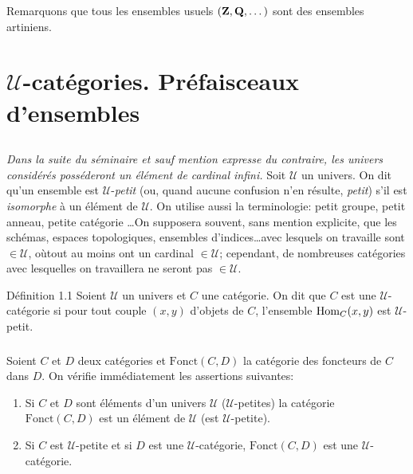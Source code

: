 \documentclass[10pt]{../fichiers-configuration-latex/smfart}
\begin{document}
Remarquons que tous les ensembles usuels $(\mathbf{Z}, \mathbf{Q},\dots)$ sont
des ensembles artiniens.

\section{$𝒰$-catégories. Préfaisceaux d'ensembles}

\setcounter{subsection}{-1}
\subsection{}
\emph{Dans la suite du séminaire et sauf mention expresse du
  contraire, les univers considérés posséderont un élément
  de cardinal infini.} Soit $𝒰$ un univers. On dit qu'un ensemble
  est $𝒰$-\emph{petit} (ou, quand aucune confusion n'en résulte,
  \emph{petit}) s'il est \emph{isomorphe} à un élément de
  $𝒰$. On utilise aussi la terminologie: petit groupe, petit anneau,
  petite catégorie
  \ldots On supposera souvent, sans mention
  explicite, que les schémas, espaces topologiques, ensembles
  d'indices\ldots avec lesquels on travaille sont $\in 𝒰$,
où\pageoriginale tout au moins ont un cardinal $\in 𝒰$;
  cependant, de nombreuses catégories avec lesquelles on travaillera
  ne seront pas $\in 𝒰$.

\begin{enonce*}{Définition 1.1}
Soient $𝒰$ un univers et $C$ une catégorie. On dit que $C$
est une $𝒰$-catégorie si pour tout couple $(x,y)$ d'objets
de $C$, l'ensemble $\operatorname{Hom}_C(x,y)$ est $𝒰$-petit.
\end{enonce*}

\setcounter{subsection}{1}
\subsubsection{}
Soient $C$ et $D$ deux catégories et $\text{Fonct}(C,D)$ la
catégorie des foncteurs de $C$ dans $D$. On vérifie immédiatement
les assertions suivantes:
\begin{enumerate}
\item[a)] Si $C$ et $D$ sont éléments d'un univers $𝒰$
  (\resp  $𝒰$-petites) la catégorie $\text{Fonct}(C,D)$ est un élément
  de $𝒰$ (\resp  est $𝒰$-petite).

\item[b)] Si $C$ est $𝒰$-petite et si $D$ est une $𝒰$-catégorie,
  $\text{Fonct}(C,D)$ est une $𝒰$-catégorie.
\end{enumerate}
\end{document}
